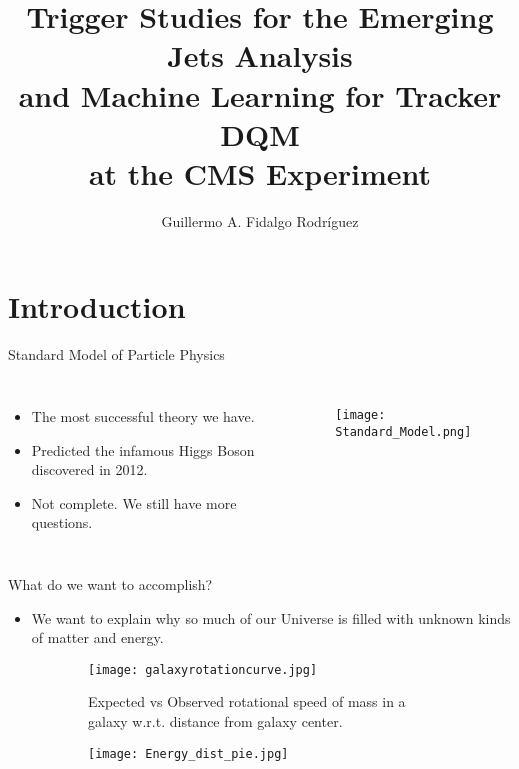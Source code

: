 \documentclass[8pt,aspectratio=169]{beamer}
\title[EMJ and ML4TkDQM]{Trigger Studies for the Emerging Jets Analysis \\and Machine Learning for Tracker DQM \\at the CMS Experiment}
\author[GAFR]{Guillermo A. Fidalgo Rodríguez}
\institute[UPRM]{University of Puerto Rico - Mayagüez}
\begin{document}
\maketitle

\begin{frame}
	\Large
	\tableofcontents
\end{frame}

\section{Introduction}

\begin{frame}{Standard Model of Particle Physics}
	\begin{columns}

		\begin{itemize}
			\item The most successful theory we have.
			\item Predicted the infamous Higgs Boson discovered in 2012.
			\item Not complete. We still have more questions.
		\end{itemize}
		\begin{figure}
			\texttt{[image: Standard\_Model.png]}
		\end{figure}
	\end{columns}
\end{frame}

\begin{frame}{What do we want to accomplish?}
	\begin{itemize}
		\item We want to explain why so much of our Universe is filled with unknown kinds of matter and energy.
	\end{itemize}
	\begin{figure}
		\centering
		\begin{subfigure}{0.45\linewidth}
			\texttt{[image: galaxyrotationcurve.jpg]}
			\caption{Expected vs Observed rotational speed of mass in a galaxy w.r.t. distance from galaxy center.}
		\end{subfigure}
		\begin{subfigure}{0.45\linewidth}
			\texttt{[image: Energy\_dist\_pie.jpg]}
		\end{subfigure}
	\end{figure}
\end{frame}
\end{document}
